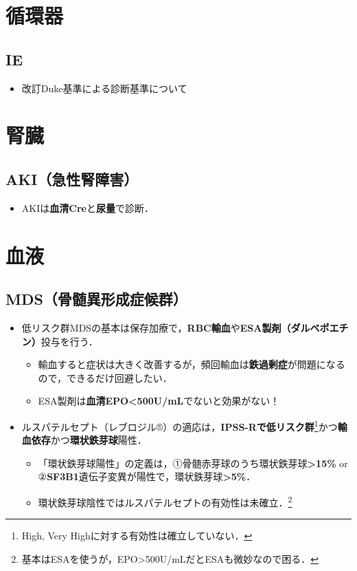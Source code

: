

\section{循環器}
\subsection{IE}
\begin{itemize}

\item 改訂Duke基準による診断基準について
\end{itemize}


\section{腎臓}

\subsection{AKI（急性腎障害）}
\begin{itemize}
\item AKIは\textbf{血清Cre}と\textbf{尿量}で診断．


\end{itemize}

\section{血液}

\subsection{MDS（骨髄異形成症候群）}
\begin{itemize}

\item 低リスク群MDSの基本は保存加療で，\textbf{RBC輸血}や\textbf{ESA製剤（ダルベポエチン）}投与を行う．
\begin{itemize}
\item 輸血すると症状は大きく改善するが，頻回輸血は\textbf{鉄過剰症}が問題になるので，できるだけ回避したい．
\item ESA製剤は\textbf{血清EPO<500U/mL}でないと効果がない！
\end{itemize}
\item ルスパテルセプト（レブロジル®）の適応は，\textbf{IPSS-Rで低リスク群}\footnote{High, Very Highに対する有効性は確立していない．}かつ\textbf{輸血依存}かつ\textbf{環状鉄芽球}陽性．

\begin{itemize}
\item 「環状鉄芽球陽性」の定義は，①骨髄赤芽球のうち環状鉄芽球\textbf{>15\%} or ②\textbf{SF3B1}遺伝子変異が陽性で，環状鉄芽球\textbf{>5\%}．
\item 環状鉄芽球陰性ではルスパテルセプトの有効性は未確立．\footnote{基本はESAを使うが，EPO>500U/mLだとESAも微妙なので困る．}

\end{itemize}

\end{itemize}

